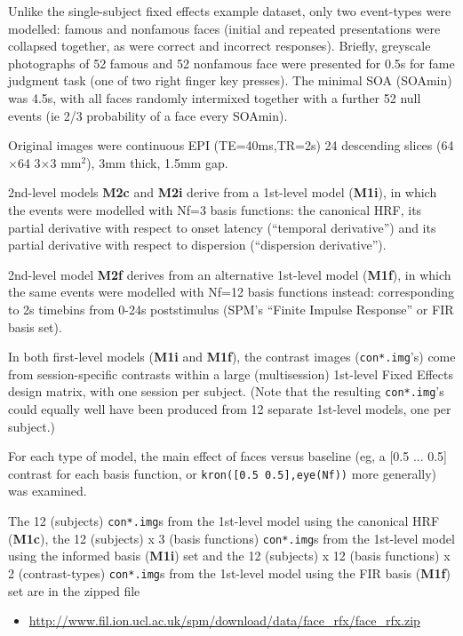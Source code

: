 Unlike the single-subject fixed effects example dataset, only two event-types were modelled: famous and nonfamous faces (initial and repeated presentations were collapsed together, as were correct and incorrect responses). Briefly, greyscale photographs of 52 famous and 52 nonfamous face were presented for 0.5s for fame judgment task (one of two right finger key presses). The minimal SOA (SOAmin) was 4.5s, with all faces randomly intermixed together with a further 52 null events (ie 2/3 probability of a face every SOAmin).

Original images were continuous EPI (TE=40ms,TR=2s) 24 descending slices (64$\times$64 3$\times$3 mm$^2$), 3mm thick, 1.5mm gap.

2nd-level models \textbf{M2c} and \textbf{M2i} derive from a 1st-level model (\textbf{M1i}), in which the events were modelled with Nf=3 basis functions: the canonical HRF, its partial derivative with respect to onset latency (``temporal derivative'') and its partial derivative with respect to dispersion (``dispersion derivative'').

2nd-level model \textbf{M2f} derives from an alternative 1st-level model (\textbf{M1f}), in which the same events were modelled with Nf=12 basis functions instead: corresponding to 2s timebins from 0-24s poststimulus (SPM's ``Finite Impulse Response'' or FIR basis set).

In both first-level models (\textbf{M1i} and \textbf{M1f}), the contrast images (\texttt{con*.img}'s) come from session-specific contrasts within a large (multisession) 1st-level Fixed Effects design matrix, with one session per subject. (Note that the resulting \texttt{con*.img}'s could equally well have been produced from 12 separate 1st-level models, one per subject.)

For each type of model, the main effect of faces versus baseline (eg, a [0.5 ... 0.5] contrast for each basis function, or \texttt{kron([0.5 0.5],eye(Nf))} more generally) was examined.

The 12 (subjects) \texttt{con*.img}s from the 1st-level model using the canonical HRF (\textbf{M1c}), the 12 (subjects) x 3 (basis functions) \texttt{con*.img}s from the 1st-level model using the informed basis (\textbf{M1i}) set and the 12 (subjects) x 12 (basis functions) x 2 (contrast-types) \texttt{con*.img}s from the 1st-level model using the FIR basis (\textbf{M1f}) set are in the zipped file
\begin{itemize}
\item \url{http://www.fil.ion.ucl.ac.uk/spm/download/data/face_rfx/face_rfx.zip}
\end{itemize}

